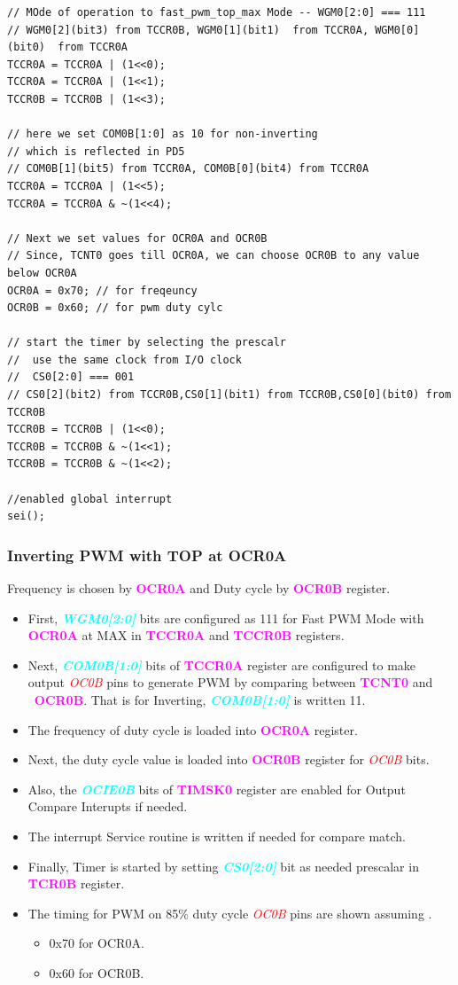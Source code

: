 \documentclass{article}
\newcommand{\bitFormat}[1]{\emph{\textbf{\textcolor{cyan}{#1}}}}
\newcommand{\regFormat}[1]{\textbf{\textcolor{magenta}{#1}}}
\newcommand{\pinFormat}[1]{\emph{\textcolor{red}{#1}}}
\begin{document}
\begin{verbatim}
// MOde of operation to fast_pwm_top_max Mode -- WGM0[2:0] === 111
// WGM0[2](bit3) from TCCR0B, WGM0[1](bit1)  from TCCR0A, WGM0[0](bit0)  from TCCR0A
TCCR0A = TCCR0A | (1<<0);
TCCR0A = TCCR0A | (1<<1);
TCCR0B = TCCR0B | (1<<3);	

// here we set COM0B[1:0] as 10 for non-inverting
// which is reflected in PD5
// COM0B[1](bit5) from TCCR0A, COM0B[0](bit4) from TCCR0A
TCCR0A = TCCR0A | (1<<5);
TCCR0A = TCCR0A & ~(1<<4);

// Next we set values for OCR0A and OCR0B
// Since, TCNT0 goes till OCR0A, we can choose OCR0B to any value below OCR0A
OCR0A = 0x70; // for freqeuncy
OCR0B = 0x60; // for pwm duty cylc

// start the timer by selecting the prescalr
//  use the same clock from I/O clock
//  CS0[2:0] === 001
// CS0[2](bit2) from TCCR0B,CS0[1](bit1) from TCCR0B,CS0[0](bit0) from TCCR0B
TCCR0B = TCCR0B | (1<<0);
TCCR0B = TCCR0B & ~(1<<1);
TCCR0B = TCCR0B & ~(1<<2);

//enabled global interrupt
sei();
\end{verbatim}

\subsubsection{Inverting PWM with TOP at  OCR0A}
\quad Frequency is chosen by \regFormat{OCR0A} and Duty cycle by \regFormat{OCR0B} register.
\begin{itemize}
    \item First, \bitFormat{WGM0[2:0]} bits are configured as 111 for Fast PWM Mode with \regFormat{OCR0A} at MAX in \regFormat{TCCR0A} and \regFormat{TCCR0B} registers.
    \item Next, \bitFormat{COM0B[1:0]} bits of \regFormat{TCCR0A} register are configured to make output \pinFormat{OC0B} pins to generate PWM by comparing between \regFormat{TCNT0} and \ \regFormat{OCR0B}. That is for Inverting, \bitFormat{COM0B[1:0]} is written 11.
    \item The frequency of duty cycle is loaded into \regFormat{OCR0A} register.
    \item Next, the duty cycle value is loaded into \regFormat{OCR0B} register for \pinFormat{OC0B} bits.
    \item Also, the \bitFormat{OCIE0B} bits of \regFormat{TIMSK0} register  are enabled for Output Compare Interupts if needed.
    \item The interrupt Service routine is written if needed for compare match.
    \item Finally, Timer is started by setting \bitFormat{CS0[2:0]} bit as needed prescalar in \regFormat{TCR0B} register.
    \item The timing for PWM on 85\% duty cycle \pinFormat{OC0B} pins are shown assuming .
    \begin{itemize}
        \item 0x70 for OCR0A.
        \item 0x60 for OCR0B.
    \end{itemize}
\end{itemize}
\end{document}
